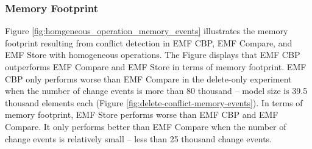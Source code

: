 \subsubsection{Memory Footprint}
\label{sec:memory_footprint}
Figure \ref{fig:homgeneous_operation_memory_events} illustrates the memory footprint resulting from conflict detection in EMF CBP, EMF Compare, and EMF Store with homogeneous operations. The Figure displays that EMF CBP outperforms EMF Compare and EMF Store in terms of memory footprint. EMF CBP only performs worse than EMF Compare in the delete-only experiment when the number of change events is more than 80 thousand -- model size is 39.5 thousand elements each (Figure \ref{fig:delete-conflict-memory-events}). In terms of memory footprint, EMF Store performs worse than EMF CBP and EMF Compare. It only performs better than EMF Compare when the number of change events is relatively small -- less than 25 thousand change events. 

